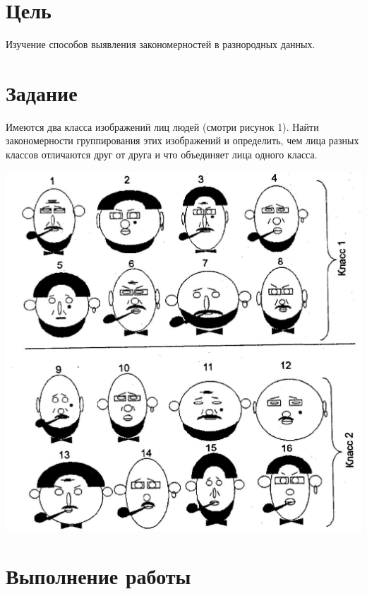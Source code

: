 \documentclass[a4paper, 12pt]{article}
\begin{document}

\pagebreak
\tableofcontents
\newpage
\section*{Цель}
Изучение способов выявления закономерностей в разнородных данных.
\section*{Задание}
Имеются два класса изображений лиц людей (смотри рисунок 1).
Найти закономерности группирования этих изображений и определить, чем
лица разных классов отличаются друг от друга и что объединяет лица одного
класса.
\begin{center}
  \centering
  \includegraphics[width=.7\linewidth]{extra/faces.jpg}
  \label{fig:prplot}
\end{center}
\newpage
\section{Выполнение работы}
\end{document}
